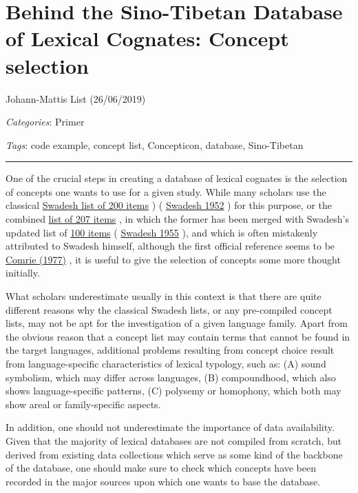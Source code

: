 \documentclass[
  a4paper,
  14pt,
  oneside,
  tablecaptionabove
]{scrbook}
\begin{document}
\newpage
\section*{Behind the Sino-Tibetan Database of Lexical
Cognates: Concept selection}

Johann-Mattis List (26/06/2019)

\emph{Categories}: Primer

\emph{Tags}: code example, concept list, Concepticon, database,
Sino-Tibetan

\begin{center}\rule{0.5\linewidth}{1pt}\end{center}

One of the crucial steps in creating a database of lexical cognates is
the selection of concepts one wants to use for a given study. While many
scholars use the classical
\href{https://concepticon.clld.org/contributions/Swadesh-1952-200}{Swadesh
list of 200 items} ) (
\href{http://bibliography.lingpy.org?key=Swadesh1952}{Swadesh 1952} )
for this purpose, or the combined
\href{https://concepticon.clld.org/contributions/Comrie-1977-207}{list
of 207 items} , in which the former has been merged with Swadesh's
updated list of
\href{https://concepticon.clld.org/paramters/Swadesh-1955-100}{100
items} ( \href{http://bibliography.lingpy.org?key=Swadesh1955}{Swadesh
1955} ), and which is often mistakenly attributed to Swadesh himself,
although the first official reference seems to be
\href{http://bibliography.lingpy.org?key=Comrie1977}{Comrie (1977)} , it
is useful to give the selection of concepts some more thought initially.

What scholars underestimate usually in this context is that there are
quite different reasons why the classical Swadesh lists, or any
pre-compiled concept lists, may not be apt for the investigation of a
given language family. Apart from the obvious reason that a concept list
may contain terms that cannot be found in the target languages,
additional problems resulting from concept choice result from
language-specific characteristics of lexical typology, such as: (A)
sound symbolism, which may differ across languages, (B) compoundhood,
which also shows language-specific patterns, (C) polysemy or homophony,
which both may show areal or family-specific aspects.

In addition, one should not underestimate the importance of data
availability. Given that the majority of lexical databases are not
compiled from scratch, but derived from existing data collections which
serve as some kind of the backbone of the database, one should make sure
to check which concepts have been recorded in the major sources upon
which one wants to base the database.
\end{document}
